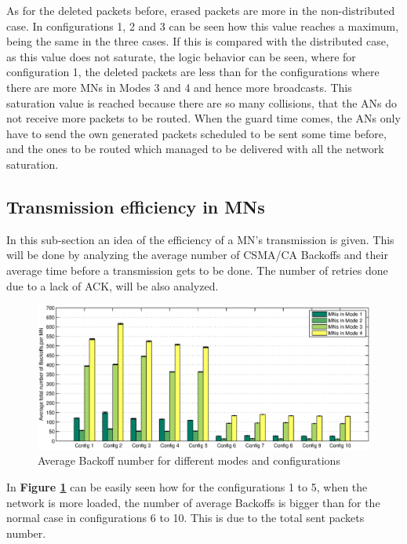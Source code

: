 As for the deleted packets before, erased packets are more in the non-distributed case. In configurations 1, 2 and 3 can be seen how this value
reaches a maximum, being the same in the three cases. If this is compared with the distributed case, as this value does not saturate, the logic behavior 
can be seen, where for configuration 1, the deleted packets are less than for the configurations where there are more \acp{MN} in Modes 3 and 4 and hence 
more broadcasts. This saturation value is reached because there are so many collisions, that the \acp{AN} do not receive more packets to be routed.
When the guard time comes, the \acp{AN} only have to send the own generated packets scheduled to be sent some time before, and the ones to be routed 
which managed to be delivered with all the network saturation.

\subsection{Transmission efficiency in \acp{MN}}

In this sub-section an idea of the efficiency of a \ac{MN}'s transmission is given. This will be done by analyzing the average number of \ac{CSMA/CA}
Backoffs and their average time before a transmission gets to be done. The number of retries done due to a lack of \ac{ACK}, will be also analyzed.

\begin{figure}[ht]
 \begin{center}
  \includegraphics[width=1\textwidth]{BackoffNumberInMN.eps}
 \end{center}
 \caption{Average Backoff number for different modes and configurations}
 \label{fig:BackoffNumberInMN}
\end{figure}

In \textbf{Figure \ref{fig:BackoffNumberInMN}} can be easily seen how for the configurations 1 to 5, when the network is more loaded, the number of 
average Backoffs is bigger than for the normal case in configurations 6 to 10. This is due to the total sent packets number.

